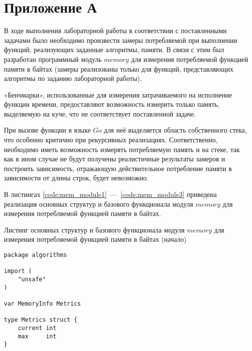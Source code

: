 \setcounter{chapter}{5}
\setcounter{listing}{0}
\chapter*{Приложение А}
\label{appendix}

В ходе выполнения лабораторной работы в соответствии с поставленными задачами было необходимо произвести замеры потребляемой при выполнении функций, реализующих заданные алгоритмы, памяти. В связи с этим был разработан программный модуль $memory$ для измерения потребляемой функцией памяти в байтах (замеры реализованы только для функций, представляющих алгоритмы по заданию лабораторной работы). 

«Бенчмарки», использованные для измерения затрачиваемого на исполнение функции времени, предоставляют возможность измерить только память, выделяемую на куче, что не соответствует поставленной задаче. 

При вызове функции в языке $Go$ для неё выделяется область собственного стека, что особенно критично при рекурсивных реализациях. Соответственно, необходимо иметь возможность измерять потребляемую память и на стеке, так как в ином случае не будут получены реалистичные результаты замеров и построить зависимость, отражающую действительное потребление памяти в зависимости от длины строк, будет невозможно.

В листингах \ref{code:mem_module1}~---~\ref{code:mem_module3} приведена реализация основных структур и базового функционала модуля $memory$ для измерения потребляемой функцией памяти в байтах.

\begin{code}
\caption{Листинг основных структур и базового функционала модуля $memory$ для измерения потребляемой функцией памяти в байтах (начало)}
\label{code:mem_module1}

\begin{verbatim}
package algorithms

import (
	"unsafe"
)

var MemoryInfo Metrics

type Metrics struct {
	current int
	max     int
}
\end{verbatim}
\end{code}

\newpage

